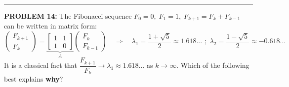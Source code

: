 \documentclass[12pt]{amsart}
\newcommand{\divider}{
  \vspace{-1em} %
  \noindent
  \raisebox{-0.15ex}{\textbullet}%
  \hspace{0.5em}%
  \rule[0.5ex]{0.95\textwidth}{1.0pt}%
  \hspace{0.5em}%
  \raisebox{-0.15ex}{\textbullet}%
  \vspace{0em} %
}
\begin{document}
%
%
%

\divider

{\bf PROBLEM 14:}
%
The Fibonacci sequence $F_0 = 0, \; F_1 = 1, \; F_{k+1} = F_k + F_{k-1}$ 
can be written in matrix form:
$$\begin{pmatrix} F_{k+1} \\ F_k \end{pmatrix} 
  = \underbrace{\begin{bmatrix} 1 & 1 \\ 1 & 0 \end{bmatrix}}_{A}
    \begin{pmatrix} F_k \\ F_{k-1} \end{pmatrix}
\quad \Rightarrow \quad \lambda_1 = \dfrac{1+\sqrt{5}}{2} \approx 1.618...\,\, ; \,\, \lambda_2= \dfrac{1-\sqrt{5}}{2} \approx -0.618...    
$$
It is a classical fact that $\dfrac{F_{k+1}}{F_k} \to \lambda_1 \approx 1.618\ldots$ as 
$k \to \infty$.
%
Which of the following best explains \textbf{why}?
\end{document}
